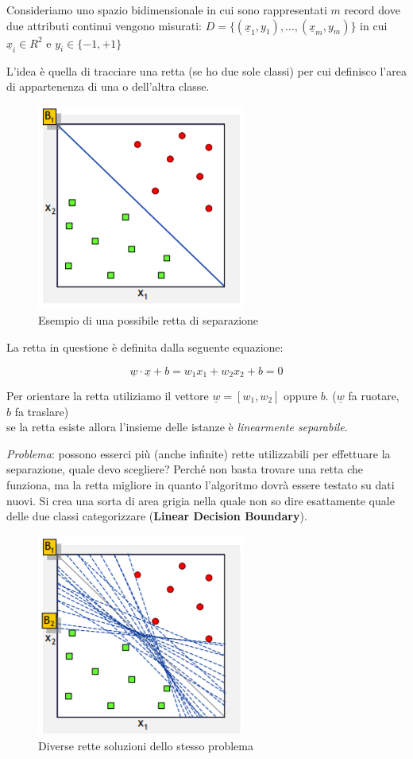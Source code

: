 Consideriamo uno spazio bidimensionale in cui sono rappresentati $m$ record dove due attributi continui vengono misurati: $D = \{(\underline{x}_1, y_1),...,(\underline{x}_m, y_m)\}$ in cui $\underline{x}_i \in R^2$ e $y_i \in \{-1, +1\}$

L'idea è quella di tracciare una retta (se ho due sole classi) per cui definisco l'area di appartenenza di una o dell'altra classe. 

\begin{figure}[H]
	\centering
	\includegraphics[height=0.4 \linewidth]{classification/pict/svm.png}
	\caption{Esempio di una possibile retta di separazione}
\end{figure}

La retta in questione è definita dalla seguente equazione:

\[\underline{w} \cdot \underline{x} + b = w_1 x_1 + w_2 x_2 + b = 0\]

Per orientare la retta utiliziamo il vettore $\underline{w} = [w_1,w_2]$ oppure $b$. ($\underline{w}$ fa ruotare, $b$ fa traslare)\\
se la retta esiste allora l'insieme delle istanze è \textit{linearmente separabile}.

\textit{Problema}: possono esserci più (anche infinite) rette utilizzabili per effettuare la separazione, quale devo scegliere? Perché non basta trovare una retta che funziona, ma la retta migliore in quanto l'algoritmo dovrà essere testato su dati nuovi. Si crea una sorta di area grigia nella quale non so dire esattamente quale delle due classi categorizzare (\textbf{Linear Decision Boundary}).

\begin{figure}[H]
	\centering
	\includegraphics[height=0.4 \linewidth]{classification/pict/svm_rette.png}
	\caption{Diverse rette soluzioni dello stesso problema}
\end{figure}

